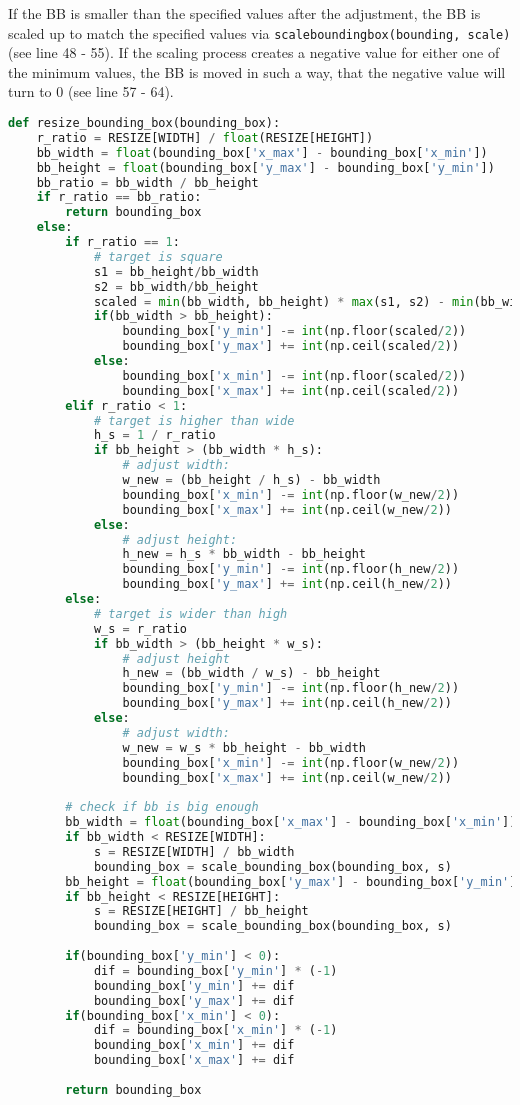 If the BB is smaller than the specified values after the adjustment, the BB is scaled up to match the specified values via \texttt{scale{\textunderscore}bounding{\textunderscore}box(bounding{\textunderscore}, scale)} (see line 48 - 55). If the scaling process creates a negative value for either one of the minimum values, the BB is moved in such a way, that the negative value will turn to 0 (see line 57 - 64).

\begin{lstlisting}[frame=single,language=python]
def resize_bounding_box(bounding_box):
	r_ratio = RESIZE[WIDTH] / float(RESIZE[HEIGHT])
	bb_width = float(bounding_box['x_max'] - bounding_box['x_min'])
	bb_height = float(bounding_box['y_max'] - bounding_box['y_min'])
	bb_ratio = bb_width / bb_height
	if r_ratio == bb_ratio:
		return bounding_box
	else:
		if r_ratio == 1:
			# target is square
			s1 = bb_height/bb_width
			s2 = bb_width/bb_height
			scaled = min(bb_width, bb_height) * max(s1, s2) - min(bb_width, bb_height)
			if(bb_width > bb_height):
				bounding_box['y_min'] -= int(np.floor(scaled/2))
				bounding_box['y_max'] += int(np.ceil(scaled/2))
			else:
				bounding_box['x_min'] -= int(np.floor(scaled/2))
				bounding_box['x_max'] += int(np.ceil(scaled/2))
		elif r_ratio < 1:
			# target is higher than wide
			h_s = 1 / r_ratio
			if bb_height > (bb_width * h_s):
				# adjust width:
				w_new = (bb_height / h_s) - bb_width
				bounding_box['x_min'] -= int(np.floor(w_new/2))
				bounding_box['x_max'] += int(np.ceil(w_new/2))
			else:
				# adjust height:
				h_new = h_s * bb_width - bb_height
				bounding_box['y_min'] -= int(np.floor(h_new/2))
				bounding_box['y_max'] += int(np.ceil(h_new/2))
		else:
			# target is wider than high
			w_s = r_ratio
			if bb_width > (bb_height * w_s):
				# adjust height
				h_new = (bb_width / w_s) - bb_height
				bounding_box['y_min'] -= int(np.floor(h_new/2))
				bounding_box['y_max'] += int(np.ceil(h_new/2))
			else:
				# adjust width:
				w_new = w_s * bb_height - bb_width
				bounding_box['x_min'] -= int(np.floor(w_new/2))
				bounding_box['x_max'] += int(np.ceil(w_new/2))
		
		# check if bb is big enough
		bb_width = float(bounding_box['x_max'] - bounding_box['x_min'])
		if bb_width < RESIZE[WIDTH]:
			s = RESIZE[WIDTH] / bb_width
			bounding_box = scale_bounding_box(bounding_box, s)
		bb_height = float(bounding_box['y_max'] - bounding_box['y_min'])
		if bb_height < RESIZE[HEIGHT]:
			s = RESIZE[HEIGHT] / bb_height
			bounding_box = scale_bounding_box(bounding_box, s)
		
		if(bounding_box['y_min'] < 0):
			dif = bounding_box['y_min'] * (-1)
			bounding_box['y_min'] += dif
			bounding_box['y_max'] += dif
		if(bounding_box['x_min'] < 0):
			dif = bounding_box['x_min'] * (-1)
			bounding_box['x_min'] += dif
			bounding_box['x_max'] += dif
	
		return bounding_box
\end{lstlisting}


